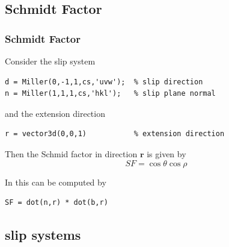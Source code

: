 \documentclass[compress]{beamer}
\begin{document}
\subsection*{Schmidt Factor}

\begin{frame}[fragile]
  \frametitle{Schmidt Factor}

  Consider the slip system
  \begin{lstlisting}[style=input]
d = Miller(0,-1,1,cs,'uvw');  % slip direction
n = Miller(1,1,1,cs,'hkl');   % slip plane normal
\end{lstlisting}

\pause

and the extension direction
  \begin{lstlisting}[style=input]
r = vector3d(0,0,1)           % extension direction
\end{lstlisting}

\pause

\medskip

Then the Schmid factor in direction $\mathbf r$ is given by
\begin{equation*}
  SF = \cos \theta \cos \rho
\end{equation*}

\pause

In \MTEX this can be computed by
  \begin{lstlisting}[style=input]
SF = dot(n,r) * dot(b,r)
  \end{lstlisting}

\end{frame}

\subsection*{slip systems}
\end{document}
